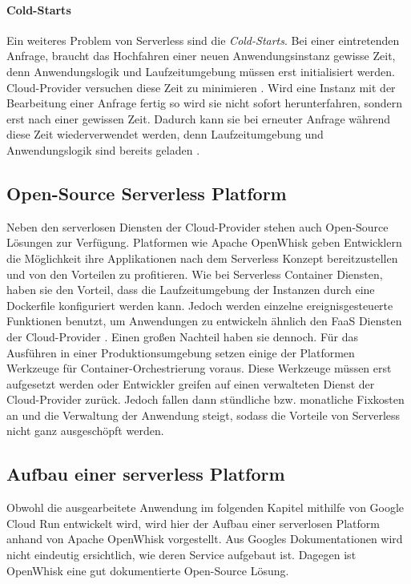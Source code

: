 \paragraph{Cold-Starts} Ein weiteres Problem von Serverless sind die \emph{Cold-Starts}.
Bei einer eintretenden Anfrage, braucht das Hochfahren einer neuen Anwendungsinstanz
gewisse Zeit, denn Anwendungslogik und Laufzeitumgebung müssen erst initialisiert werden.
Cloud-Provider versuchen diese Zeit zu minimieren \cite{Firecracker}. Wird eine Instanz mit der Bearbeitung einer Anfrage
fertig so wird sie nicht sofort herunterfahren, sondern erst nach einer gewissen Zeit.
Dadurch kann sie bei erneuter Anfrage während diese Zeit wiederverwendet werden, denn Laufzeitumgebung und
Anwendungslogik sind bereits geladen \cite{ColdStartComp}.

\subsection{Open-Source Serverless Platform}

Neben den serverlosen Diensten der Cloud-Provider stehen
auch Open-Source Lösungen zur Verfügung. Platformen wie
Apache OpenWhisk \cite{OpenWhiskGithub} geben
Entwicklern die Möglichkeit ihre Applikationen
nach dem Serverless Konzept bereitzustellen und
von den Vorteilen zu profitieren. Wie bei Serverless
Container Diensten, haben sie den Vorteil,
dass die Laufzeitumgebung der Instanzen durch
eine Dockerfile konfiguriert werden kann.
Jedoch werden einzelne ereignisgesteuerte Funktionen benutzt,
um Anwendungen zu entwickeln ähnlich den FaaS Diensten der
Cloud-Provider \cite{OpenWhiskGithub}.
Einen großen Nachteil haben sie dennoch.
Für das Ausführen in einer Produktionsumgebung setzen einige
der Platformen Werkzeuge für Container-Orchestrierung voraus.
Diese Werkzeuge müssen erst aufgesetzt werden oder Entwickler greifen auf
einen verwalteten Dienst der Cloud-Provider zurück. Jedoch fallen
dann stündliche bzw. monatliche Fixkosten an und die
Verwaltung der Anwendung steigt, sodass die Vorteile
von Serverless nicht ganz ausgeschöpft werden.

\subsection{Aufbau einer serverless Platform}
Obwohl die ausgearbeitete Anwendung im folgenden Kapitel
mithilfe von Google Cloud Run entwickelt wird,
wird hier der Aufbau einer serverlosen Platform
anhand von Apache OpenWhisk vorgestellt.
Aus Googles Dokumentationen wird nicht eindeutig ersichtlich, wie
deren Service aufgebaut ist. Dagegen ist OpenWhisk eine
gut dokumentierte Open-Source Lösung.

